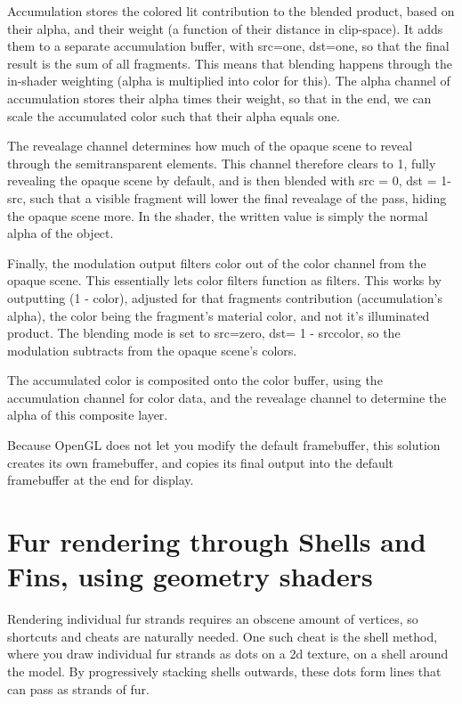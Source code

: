 \documentclass[a4paper, 12pt]{article}
\begin{document}
    Accumulation stores the colored lit contribution to the blended product,
    based on their alpha, and their weight (a function of their distance in clip-space).
    It adds them to a separate accumulation buffer, with src=one, dst=one,
    so that the final result is the sum of all fragments.
    This means that blending happens through the in-shader weighting (alpha is multiplied into color for this).
    The alpha channel of accumulation stores their alpha times their weight,
    so that in the end, we can scale the accumulated color such that their alpha equals one.

    The revealage channel determines how much of the opaque scene
    to reveal through the semitransparent elements.
    This channel therefore clears to 1, fully revealing the opaque scene by default,
    and is then blended with src = 0, dst = 1-src,
    such that a visible fragment
    will lower the final revealage of the pass,
    hiding the opaque scene more.
    In the shader, the written value is simply the normal alpha of the object.

    Finally, the modulation output filters color out of the color channel from the opaque scene.
    This essentially lets color filters function as filters.
    This works by outputting (1 - color), adjusted for that fragments contribution (accumulation's alpha),
    the color being the fragment's material color, and not it's illuminated product.
    The blending mode is set to src=zero, dst= 1 - srccolor,
    so the modulation subtracts from the opaque scene's colors.

    The accumulated color is composited onto the color buffer,
    using the accumulation channel for color data,
    and the revealage channel to determine the alpha of this composite layer.

    Because OpenGL does not let you modify the default framebuffer,
    this solution creates its own framebuffer,
    and copies its final output into the default framebuffer at the end for display.

    \section{Fur rendering through Shells and Fins, using geometry shaders}

    Rendering individual fur strands requires an obscene amount of vertices,
    so shortcuts and cheats are naturally needed.
    One such cheat is the shell method,
    where you draw individual fur strands as dots on a 2d texture,
    on a shell around the model.
    By progressively stacking shells outwards,
    these dots form lines that can pass as strands of fur.
\end{document}
